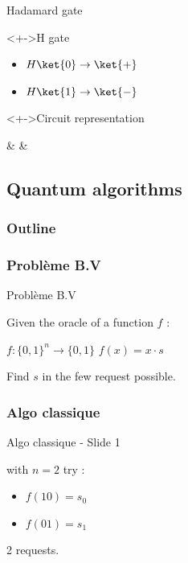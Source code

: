 \documentclass{beamer}
\begin{document}
\begin{frame}{Hadamard gate}
	\begin{block}<+->{H gate}
			\begin{itemize}
					\item $H\ket{0} \rightarrow \ket{+}$
					\item $H\ket{1} \rightarrow \ket{-}$
			\end{itemize}
	\end{block}
	\begin{block}<+->{Circuit representation}
			\centering
			\begin{quantikz}
					\lstick{$\ket{\psi}$} &  & \meter{}
			\end{quantikz}
	\end{block}
\end{frame}

\subsection{Quantum algorithms}
\begin{frame}
  \frametitle{Outline}
\end{frame}

\subsubsection*{Problème B.V}
\begin{frame}{Problème B.V}
\begin{linenumbers}
Given the oracle of a function $f$ :

$f : \{0, 1\}^n \rightarrow \{0, 1\}$
$f(x) = x\cdot s$

Find $s$ in the few request possible.
\end{linenumbers}
\end{frame}

\subsubsection*{Algo classique}
\begin{frame}{Algo classique - Slide 1}
\begin{linenumbers}
with $n=2$
try :
\begin{itemize}[<+->]
    \item $f(10) = s_0$
    \item $f(01) = s_1$
\end{itemize}

2 requests.
\end{linenumbers}
\end{frame}
\end{document}
